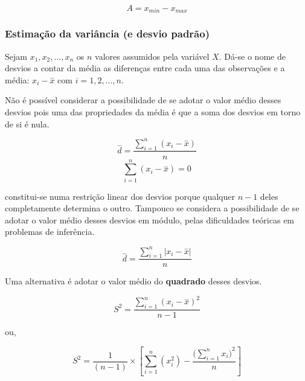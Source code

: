 \documentclass[
]{book}
\begin{document}
\hfill\break

\[
A=x_{min} - x_{max}
\]

\hfill\break

\hypertarget{estimauxe7uxe3o-da-variuxe2ncia-e-desvio-padruxe3o}{%
\subsubsection{Estimação da variância (e desvio padrão)}\label{estimauxe7uxe3o-da-variuxe2ncia-e-desvio-padruxe3o}}

\hfill\break

Sejam \(x_{1}, x_{2}, ..., x_{n}\) os \(n\) valores assumidos pela variável \(X\). Dá-se o nome de desvios a contar da média as diferenças entre cada uma das observações e a média: \(x_{i} - \stackrel{-}{x}\) com \(i=1,2,...,n\).

\hfill\break

Não é possível considerar a possibilidade de se adotar o valor médio desses desvios pois uma das propriedades da média é que a soma dos desvios em torno de si é nula.

\hfill\break

\[
\stackrel{-}{d} = \frac{\sum _{i=1}^{n}\left(x_{i}-\stackrel{-}{x}\right)}{n}
\]
\[
\sum _{i=1}^{n}\left(x_{i}-\stackrel{-}{x}\right)=0
\]

\hfill\break

constitui-se numa restrição linear dos desvios porque qualquer \(n-1\) deles completamente determina o outro. Tampouco se considera a possibilidade de se adotar o valor médio desses desvios em módulo, pelas dificuldades teóricas em problemas de inferência.

\hfill\break

\[
\stackrel{-}{d}  = \frac{\sum _{i=1}^{n}\left|x_{i}-\stackrel{-}{x}\right|}{n}
\]

\hfill\break

Uma alternativa é adotar o valor médio do \textbf{quadrado} desses desvios.

\hfill\break

\[
S^{2}=\frac{\sum _{i=1}^{n}\left(x_{i}-\stackrel{-}{x}\right)^{2}}{n-1}
\]

\hfill\break

ou,

\hfill\break

\[
S^{2}=\frac{1}{(n-1)} \times \left[ \sum _{i=1}^{n} (x_{i}^{2}) - \frac{({\sum _{i=1}^{n}x_{i})}^{2} }{n}\right]
\]

\hfill\break
\end{document}
